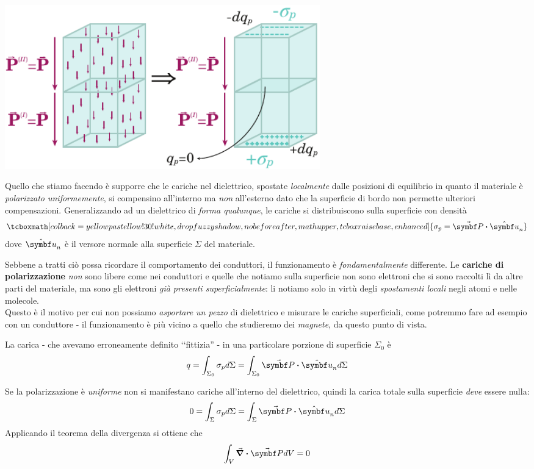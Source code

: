 \begin{center}
	\includegraphics[width=0.6\textwidth]{images/chp6/chp6caricapolari2.pdf}
\end{center}
Quello che stiamo facendo è supporre che le cariche nel dielettrico, spostate \textit{localmente} dalle posizioni di equilibrio in quanto il materiale è \textit{polarizzato uniformemente}, si compensino all'interno ma \textit{non} all'esterno dato che la superficie di bordo non permette ulteriori compensazioni. Generalizzando ad un dielettrico di \textit{forma qualunque}, le cariche si distribuiscono sulla superficie con densità
\begin{equation}
	\tcboxmath[colback=yellowpastellow!30!white,drop fuzzy shadow, nobeforeafter, math upper, tcbox raise base, enhanced]{\sigma_p=\vba{P}\vdot \vbh{u}_n}
\end{equation}
dove $\vbh{u}_n$ è il versore normale alla superficie $\Sigma$ del materiale.
\begin{attention}
	Sebbene a tratti ciò possa ricordare il comportamento dei conduttori, il funzionamento è \textit{fondamentalmente} differente. Le \textbf{cariche di polarizzazione} \textit{non} sono libere come nei conduttori e quelle che notiamo sulla superficie non sono elettroni che si sono raccolti lì da altre parti del materiale, ma sono gli elettroni \textit{già presenti superficialmente}: li notiamo solo in virtù degli \textit{spostamenti locali} negli atomi e nelle molecole.\\
	Questo è il motivo per cui non possiamo \textit{asportare un pezzo} di dielettrico e misurare le cariche superficiali, come potremmo fare ad esempio con un conduttore - il funzionamento è più vicino a quello che studieremo dei \textit{magnete}, da questo punto di vista.
\end{attention}
\noindent La carica - che avevamo erroneamente definito ‘‘fittizia'' - in una particolare porzione di superficie $\Sigma_0$ è
\begin{equation}
	q=\int_{\Sigma_0}\sigma_pd\Sigma=\int_{\Sigma_0}\vba{P}\vdot \vbh{u}_nd\Sigma
	\end{equation}
\begin{observe}
	Se la polarizzazione è \textit{uniforme} non si manifestano cariche all'interno del dielettrico, quindi la carica totale sulla superficie \textit{deve} essere nulla:
	\begin{equation*}
		0=\int_{\Sigma} \sigma_p d\Sigma=\int_\Sigma \vba{P}\vdot\vbh{u}_nd\Sigma
	\end{equation*}
	Applicando il teorema della divergenza si ottiene che
	\begin{equation}
		\int_{V}\div{\vba{P}}dV=0
	\end{equation}
\end{observe}
